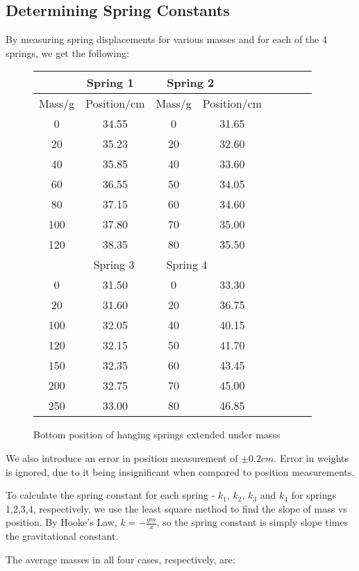 \documentclass[main.tex]{subfiles}
\begin{document}
\subsection{Determining Spring Constants}
By measuring spring displacements for various masses and for each of the 4 springs, we get the following:

\begin{figure}[H]

\begin{tabular}{|c|c|c|c|c|c|c|c|}
\hline 
\multicolumn{4}{|c|}{Spring 1  $ \ \ \ \ \ \ \ \ \ \ $ Spring 2} \\
\hline
Mass/g & Position/cm & Mass/g & Position/cm \\
\hline
0 & 34.55 & 0 & 31.65 \\
20 & 35.23 & 20 & 32.60 \\
40 & 35.85 & 40 & 33.60 \\
60 & 36.55 & 50 & 34.05 \\
80 & 37.15 & 60 & 34.60 \\
100 & 37.80 & 70 & 35.00 \\
120 & 38.35 & 80 & 35.50 \\
\hline
\hline 
\multicolumn{4}{|c|}{Spring 3  $ \ \ \ \ \ \ \ \ \ \ $ Spring 4} \\
\hline
\hline 
0 & 31.50 & 0 & 33.30 \\
20 & 31.60 & 20 & 36.75 \\
100 & 32.05 & 40 & 40.15 \\
120 & 32.15 & 50 & 41.70 \\
150 & 32.35 & 60 & 43.45 \\
200 & 32.75 & 70 & 45.00 \\
250 & 33.00 & 80 & 46.85 \\
\hline
\end{tabular}
\caption{Bottom position of hanging springs extended under masss}
\end{figure}

We also introduce an error in position measurement of $ \pm 0.2cm$. Error in weights is ignored, due to it being insignificant when compared to position measurements.

To calculate the spring constant for each spring - $k_1$, $k_2$, $k_3$ and $k_4$ for springs 1,2,3,4, respectively, we use the least square method to find the slope of mass vs position. By Hooke's Law, $ k = -\frac{gm}{x} $, so the spring constant is simply slope times the gravitational constant. 

The average masses in all four cases, respectively, are: 
\end{document}

